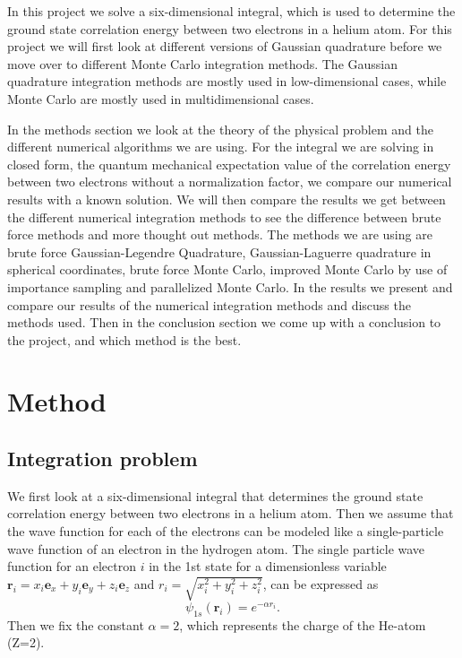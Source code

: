 \documentclass[12pt,a4paper,english]{article}
\begin{document}
In this project we solve a six-dimensional integral, which is used to determine the ground state correlation energy between two electrons in a helium atom. For this project we will first look at different versions of Gaussian quadrature before we move over to different Monte Carlo integration methods. The Gaussian quadrature integration methods are mostly used in low-dimensional cases, while Monte Carlo are mostly used in multidimensional cases.

In the methods section we look at the theory of the physical problem and the different numerical algorithms we are using. For the integral we are solving in closed form, the quantum mechanical expectation value of the correlation energy between two electrons without a normalization factor, we compare our numerical results with a known solution. We will then compare the results we get between the different numerical integration methods to see the difference between brute force methods and more thought out methods. The methods we are using are brute force Gaussian-Legendre Quadrature, Gaussian-Laguerre quadrature in spherical coordinates, brute force Monte Carlo, improved Monte Carlo by use of importance sampling and parallelized Monte Carlo. In the results we present and compare our results of the numerical integration methods and discuss the methods used. Then in the conclusion section we come up with a conclusion to the project, and which method is the best.

\section{Method}
\subsection{Integration problem}
We first look at a six-dimensional integral that determines the ground state correlation energy between two electrons in a helium atom. Then we assume that the wave function for each of the electrons can be modeled like a single-particle wave function of an electron in the hydrogen atom. The single particle wave function for an electron $i$ in the 1st state for a dimensionless variable $\textbf{r}_i=x_i\textbf{e}_x+y_i\textbf{e}_y+z_i\textbf{e}_z$ and $r_i=\sqrt{x_i^2+y_i^2+z_i^2}$, can be expressed as 
\begin{equation}
\label{eq:wave_func}
\psi_{1s}(\textbf{r}_i)=e^{-\alpha r_i}.
\end{equation}
Then we fix the constant $\alpha=2$, which represents the charge of the He-atom (Z=2). 
\end{document}
